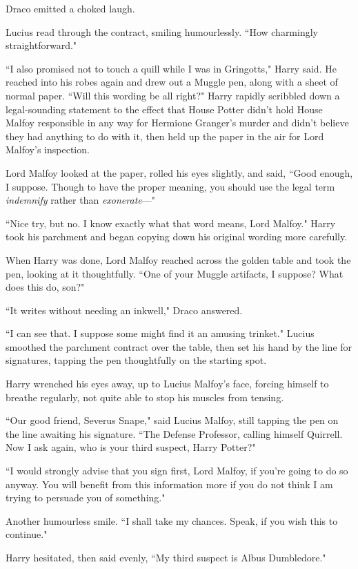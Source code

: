 Draco emitted a choked laugh.

Lucius read through the contract, smiling humourlessly. ``How charmingly straightforward."

``I also promised not to touch a quill while I was in Gringotts," Harry said. He reached into his robes again and drew out a Muggle pen, along with a sheet of normal paper. ``Will this wording be all right?" Harry rapidly scribbled down a legal-sounding statement to the effect that House Potter didn't hold House Malfoy responsible in any way for Hermione Granger's murder and didn't believe they had anything to do with it, then held up the paper in the air for Lord Malfoy's inspection.

Lord Malfoy looked at the paper, rolled his eyes slightly, and said, ``Good enough, I suppose. Though to have the proper meaning, you should use the legal term \emph{indemnify} rather than \emph{exonerate}—"

``Nice try, but no. I know exactly what that word means, Lord Malfoy." Harry took his parchment and began copying down his original wording more carefully.

When Harry was done, Lord Malfoy reached across the golden table and took the pen, looking at it thoughtfully. ``One of your Muggle artifacts, I suppose? What does this do, son?"

``It writes without needing an inkwell," Draco answered.

``I can see that. I suppose some might find it an amusing trinket." Lucius smoothed the parchment contract over the table, then set his hand by the line for signatures, tapping the pen thoughtfully on the starting spot.

Harry wrenched his eyes away, up to Lucius Malfoy's face, forcing himself to breathe regularly, not quite able to stop his muscles from tensing.

``Our good friend, Severus Snape," said Lucius Malfoy, still tapping the pen on the line awaiting his signature. ``The Defense Professor, calling himself Quirrell. Now I ask again, who is your third suspect, Harry Potter?"

``I would strongly advise that you sign first, Lord Malfoy, if you're going to do so anyway. You will benefit from this information more if you do not think I am trying to persuade you of something."

Another humourless smile. ``I shall take my chances. Speak, if you wish this to continue."

Harry hesitated, then said evenly, ``My third suspect is Albus Dumbledore."

